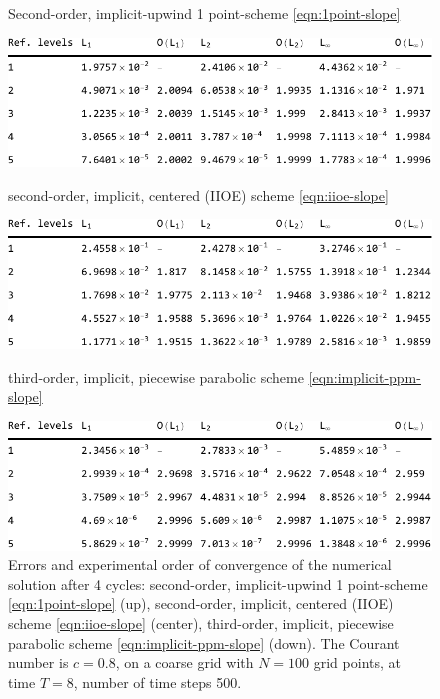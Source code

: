 \documentclass[../thesis.tex]{subfiles}
\begin{document}
\begin{figure}[H]
	\centering
    \caption*{Second-order, implicit-upwind 1 point-scheme \eqref{eqn:1point-slope}}
	\includegraphics[width=\textwidth]{../tab/tab-1point-c0p8-T8-limit0-smooth.pdf}
    \caption*{second-order, implicit, centered (IIOE) scheme \eqref{eqn:iioe-slope}}
	\includegraphics[width=\textwidth]{../tab/tab-iioe-c0p8-T8-limit0-smooth.pdf}
    \caption*{third-order, implicit, piecewise parabolic scheme \eqref{eqn:implicit-ppm-slope}}
	\includegraphics[width=\textwidth]{../tab/tab-implicit-ppm-c0p8-T8-limit0-smooth.pdf}
	\caption{Errors and experimental order of convergence of the numerical solution after 4 cycles: second-order, implicit-upwind 1 point-scheme \eqref{eqn:1point-slope} (up), second-order, implicit, centered (IIOE) scheme \eqref{eqn:iioe-slope} (center), third-order, implicit, piecewise parabolic scheme \eqref{eqn:implicit-ppm-slope} (down). The Courant number is \(c = 0.8\), on a coarse grid with \(N = 100\) grid points, at time \(T = 8\), number of time steps 500.}
	\label{tab:c0p8-T8-limit0-smooth}
\end{figure}
\end{document}
